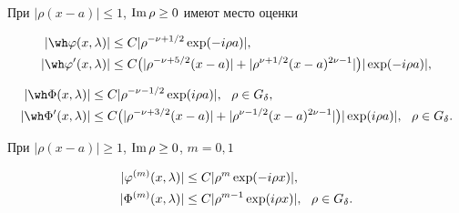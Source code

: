 \begin{lem}


При $|\rho(x-a)|\le 1$, $\operatorname{Im}\rho\ge 0$ имеют место оценки


\begin{equation}


\begin{split}


|\wh\vv(x,\la)|&\le C |\rho^{-\nu+1/2}\exp(-i\rho a)|,\\


|\wh\vv'(x,\la)|&\le C\big(|\rho^{-\nu+5/2}(x-a)|+


|\rho^{\nu+1/2}(x-a)^{2\nu-1}|\big)|\exp(-i\rho a)|,


\end{split}


\end{equation}


%


\begin{equation}


\begin{split}


|\wh\Phi(x,\la)|&\le C|\rho^{-\nu-1/2}\exp(i\rho a)|,\ \ \rho\in G_\de,\\


|\wh\Phi'(x,\la)|&\le C\big(|\rho^{-\nu+3/2}(x-a)|+


|\rho^{\nu-1/2}(x-a)^{2\nu-1}|\big)|\exp(i\rho a)|, \ \ \rho\in G_\de.


\end{split}


\end{equation}


При $|\rho(x-a)|\ge 1$, $\operatorname{Im}\rho\ge 0$, $m=0,1$


\begin{equation}


\begin{split}


|\vv^{(m)}(x,\la)|&\le C |\rho^{m}\exp(-i\rho x)|,\\


|\Phi^{(m)}(x,\la)|&\le C|\rho^{m-1}\exp(i\rho x)|,\ \ \rho\in G_\de.


\end{split}


\end{equation}


\end{lem}






